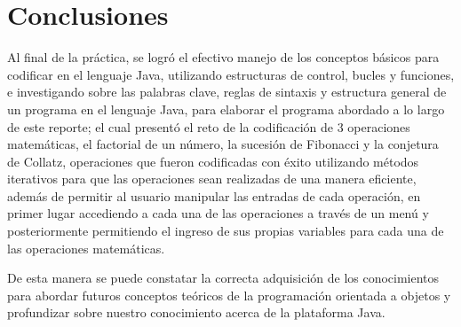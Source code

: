 \documentclass[letterpaper,12pt,oneside]{article}
\begin{document}
\section{Conclusiones}
 Al final de la práctica, se logró el efectivo manejo de los conceptos básicos para codificar en el lenguaje Java, utilizando estructuras de control, bucles y funciones, e investigando sobre las palabras clave, reglas de sintaxis y estructura general de un programa en el lenguaje Java, para elaborar el programa abordado a lo largo de este reporte; el cual presentó el reto de la codificación de 3 operaciones matemáticas, el factorial de un número, la sucesión de Fibonacci y la conjetura de Collatz, operaciones que fueron codificadas con éxito utilizando métodos iterativos para que las operaciones sean realizadas de una manera eficiente, además de permitir al usuario manipular las entradas de cada operación, en primer lugar accediendo a cada una de las operaciones a través de un menú y posteriormente permitiendo el ingreso de sus propias variables para cada una de las operaciones matemáticas. 
 
 De esta manera se puede constatar la correcta adquisición de los conocimientos para abordar futuros conceptos teóricos de la programación orientada a objetos y profundizar sobre nuestro conocimiento acerca de la plataforma Java.


\printbibliography
\end{document}
